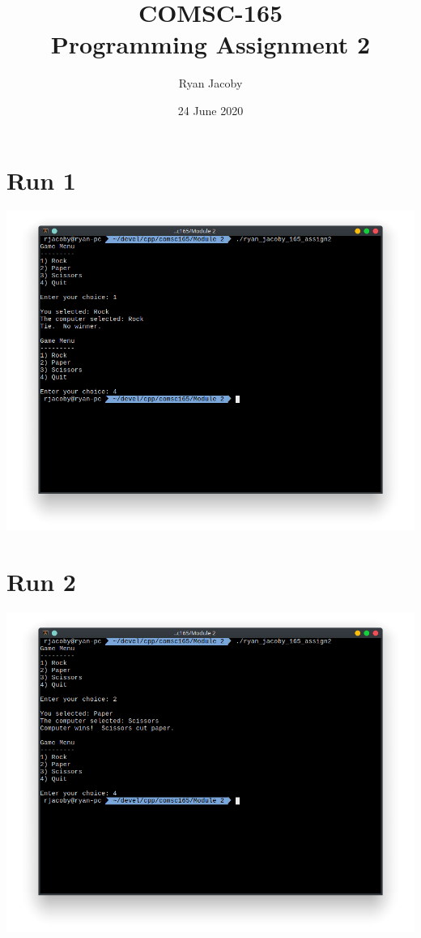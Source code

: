\documentclass[letterpaper, 11pt]{article}
\title{COMSC-165 \\ Programming Assignment 2}
\author{Ryan Jacoby}
\date{24 June 2020}
\begin{document}
\maketitle

\section*{Run 1}
\includegraphics[scale=0.5]{run1.png}

\section*{Run 2}
\includegraphics[scale=0.5]{run2.png}
\end{document}
